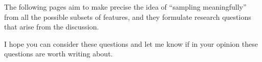 The following pages aim to make precise the idea of 
``sampling meaningfully''
from all the possible subsets of features,
and they formulate research questions that arise from the discussion. 

I hope you can consider these questions 
and let me know if in your opinion these questions are worth writing about.





